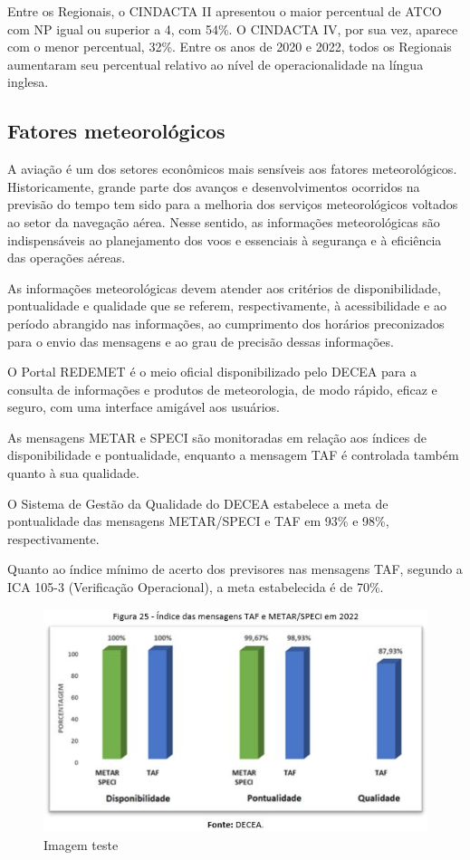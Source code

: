 \documentclass[
]{book}
\begin{document}
Entre os Regionais, o CINDACTA II apresentou o maior percentual de ATCO com NP igual ou superior a 4, com 54\%. O CINDACTA IV, por sua vez, aparece com o menor percentual, 32\%. Entre os anos de 2020 e 2022, todos os Regionais aumentaram seu percentual relativo ao nível de operacionalidade na língua inglesa.

\hypertarget{fatores-meteoroluxf3gicos}{%
\subsection{Fatores meteorológicos}\label{fatores-meteoroluxf3gicos}}

A aviação é um dos setores econômicos mais sensíveis aos fatores meteorológicos. Historicamente, grande parte dos avanços e desenvolvimentos ocorridos na previsão do tempo tem sido para a melhoria dos serviços meteorológicos voltados ao setor da navegação aérea. Nesse sentido, as informações meteorológicas são indispensáveis ao planejamento dos voos e essenciais à segurança e à eficiência das operações aéreas.

As informações meteorológicas devem atender aos critérios de disponibilidade, pontualidade e qualidade que se referem, respectivamente, à acessibilidade e ao período abrangido nas informações, ao cumprimento dos horários preconizados para o envio das mensagens e ao grau de precisão dessas informações.

O Portal REDEMET é o meio oficial disponibilizado pelo DECEA para a consulta de informações e produtos de meteorologia, de modo rápido, eficaz e seguro, com uma interface amigável aos usuários.

As mensagens METAR e SPECI são monitoradas em relação aos índices de disponibilidade e pontualidade, enquanto a mensagem TAF é controlada também quanto à sua qualidade.

O Sistema de Gestão da Qualidade do DECEA estabelece a meta de pontualidade das mensagens METAR/SPECI e TAF em 93\% e 98\%, respectivamente.

Quanto ao índice mínimo de acerto dos previsores nas mensagens TAF, segundo a ICA 105-3 (Verificação Operacional), a meta estabelecida é de 70\%.

\begin{figure}
\centering
\includegraphics{imagens/fig28.jpg}
\caption{Imagem teste}
\end{figure}
\end{document}
